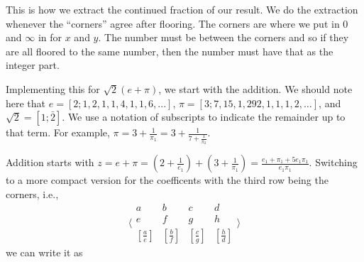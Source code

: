 \documentclass[12pt]{article}
\theoremstyle{remark}
\begin{document}
This is how we extract the continued fraction of our result. We do the extraction whenever the ``corners'' agree after flooring. The corners are where we put in 0 and $\infty$ in for $x$ and $y$. The number must be between the corners and so if they are all floored to the same number, then the number must have that as the integer part.

Implementing this for $\sqrt{2}(e + \pi)$, we start with the addition. We should note here that $e = [2; 1, 2, 1, 1, 4, 1, 1, 6, ...]$, $\pi = [3; 7, 15, 1, 292, 1, 1, 1, 2, \ldots]$, and $\sqrt{2} = [1; \bar{2}]$. We use a notation of subscripts to indicate the remainder up to that term. For example, $\pi = 3 + \frac{1}{\pi_1} =  3 + \frac{1}{7 + \frac{1}{\pi_2}}$. 

Addition starts with $z = e + \pi =  (2 + \frac{1}{e_1} ) + (3 + \frac{1}{\pi_1}) = \frac{e_1 + \pi_1 + 5 e_1 \pi_1}{e_1 \pi_1}$. Switching to a more compact version for the coefficents with the third row being the corners, i.e., 
$$\bigg\langle\begin{smallmatrix}
  a & b & c & d\\
  e & f & g & h \\
  [\frac{a}{e}] & [\frac{b}{f}] & [\frac{c}{g}] & [\frac{h}{d}] 
\end{smallmatrix}\bigg\rangle$$ we can write it as 
\end{document}
